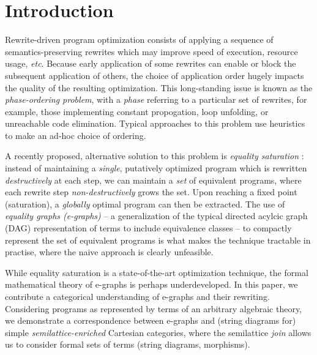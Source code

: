 
\newcommand\mylet[2]{\textsf{let } #1 = #2 \textsf{ in }}





\section{Introduction}

Rewrite-driven program optimization consists of applying a sequence of semantics-preserving rewrites which may improve speed of execution, resource usage, \textit{etc}. Because early application of some rewrites can enable or block the subsequent application of others, the choice of application order hugely impacts the quality of the resulting optimization.  This long-standing issue is known as the \textit{phase-ordering problem}, with a \textit{phase} referring to a particular set of rewrites, for example,  those implementing constant propogation, loop unfolding, or unreachable code elimination. Typical approaches to this problem use heuristics to make an ad-hoc choice of ordering. 

A recently proposed,  alternative solution to this problem is \textit{equality saturation} 
\cite{10.1145/1594834.1480915}: instead of maintaining a \textit{single},  putatively optimized program which is rewritten \textit{destructively} at each step, we can maintain a \textit{set} of equivalent programs, where each rewrite step \textit{non-destructively} grows the set.  Upon reaching a fixed point ({saturation}),  a \textit{globally} optimal program can then be extracted.%
The use of \textit{equality graphs (e-graphs)} \cite{EggPaper} -- a generalization of the typical directed acylcic graph (DAG) representation of terms to include equivalence classes -- to compactly represent the set of equivalent programs is what makes the technique tractable in practise, where the naive approach is clearly unfeasible. 

While equality saturation is a state-of-the-art optimization technique, the formal mathematical theory of e-graphs is perhaps underdeveloped. In this paper, we contribute a categorical understanding of e-graphs and their rewriting. Considering programs as represented by terms of an arbitrary algebraic theory, we demonstrate a correspondence between e-graphs and (string diagrams for) simple \textit{semilattice-enriched} Cartesian categories, where the semilattice \textit{join} allows us to consider formal sets of terms (string diagrams, morphisms). 

